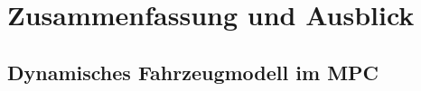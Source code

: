 \documentclass{like}
\begin{document}
\chapter[Zusammenfassung]{Zusammenfassung und Ausblick}
\section{Dynamisches Fahrzeugmodell im MPC}



\appendix





%



%


\end{document}
